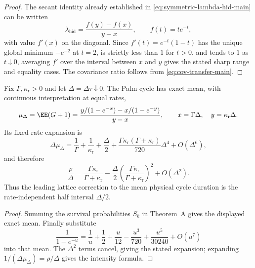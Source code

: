 \begin{proof}
The secant identity already established in
\eqref{eq:symmetric-lambda-hid-main} can be written
\[
\lambda_{\mathrm{hid}}
=\frac{f(y)-f(x)}{y-x},\qquad f(t)=te^{-t},
\]
with value \(f'(x)\) on the diagonal.  Since
\(f'(t)=e^{-t}(1-t)\) has the unique global minimum \(-e^{-2}\) at
\(t=2\), is strictly less than \(1\) for \(t>0\), and tends to \(1\) as
\(t\downarrow0\), averaging \(f'\) over the interval between \(x\) and \(y\)
gives the stated sharp range and equality cases.  The covariance ratio follows
from \eqref{eq:cov-transfer-main}.
\end{proof}

\begin{proposition}
\label{prop:fast-sampling-cycle-bias-main}
Fix \(\Gamma,\kappa_{\mathrm r}>0\) and let
\(\Delta=\Delta\tau\downarrow0\).  The Palm cycle has exact mean, with
continuous interpretation at equal rates,
\[
\mu_\Delta=\EE(G+1)
=\frac{y/(1-e^{-x})-x/(1-e^{-y})}{y-x},
\qquad x=\Gamma\Delta,\quad y=\kappa_{\mathrm r}\Delta.
\]
Its fixed-rate expansion is
\[
\Delta\mu_\Delta
=\frac1\Gamma+\frac1{\kappa_{\mathrm r}}+\frac\Delta2
+\frac{\Gamma\kappa_{\mathrm r}(\Gamma+\kappa_{\mathrm r})}{720}
 \Delta^4+O(\Delta^6),
\]
and therefore
\[
\frac\rho\Delta
=\frac{\Gamma\kappa_{\mathrm r}}{\Gamma+\kappa_{\mathrm r}}
-\frac\Delta2
 \left(\frac{\Gamma\kappa_{\mathrm r}}
 {\Gamma+\kappa_{\mathrm r}}\right)^2+O(\Delta^2).
\]
Thus the leading lattice correction to the mean physical cycle duration is
the rate-independent half interval \(\Delta/2\).
\end{proposition}

\begin{proof}
Summing the survival probabilities \(S_k\) in Theorem~A gives the displayed
exact mean.  Finally substitute
\[
\frac1{1-e^{-u}}=\frac1u+\frac12+\frac{u}{12}
-\frac{u^3}{720}+\frac{u^5}{30240}+O(u^7)
\]
into that mean.  The \(\Delta^2\) terms cancel, giving the stated expansion;
expanding \(1/(\Delta\mu_\Delta)=\rho/\Delta\) gives the intensity formula.
\end{proof}

